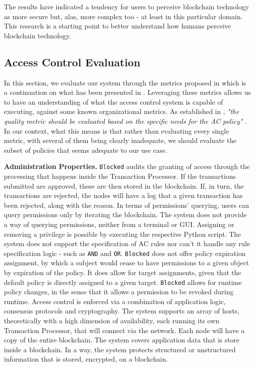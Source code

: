 The results have indicated a tendency for users to perceive blockchain technology as more secure but, alas, more complex too - at least in this particular domain. This research is a starting point to better understand how humans perceive blockchain technology.

\subsection{Access Control Evaluation}
\label{sec:eval-ac}

In this section, we evaluate our system through the metrics proposed in \cite{hu_guidelines_2012} which is a continuation on what has been presented in \cite{hu_assessment_2006}. Leveraging these metrics allows us to have an understanding of what the access control system is capable of executing, against some known organizational metrics. As established in \cite{hu_guidelines_2012}, \emph{"the quality metric should be evaluated based on the specific needs for the AC policy"} \cite[25]{hu_guidelines_2012}. In our context, what this means is that rather than evaluating every single metric, with several of them being clearly inadequate, we should evaluate the subset of policies that seems adequate to our use case.

\textbf{Administration Properties.} \texttt{Blocked} audits the granting of access through the processing that happens inside the Transaction Processor. If the transactions submitted are approved, these are then stored in the blockchain. If, in turn, the transactions are rejected, the nodes will have a log that a given transaction has been rejected, along with the reason. In terms of permissions' querying, users can query permissions only by iterating the blockchain. The system does not provide a way of querying permissions, neither from a terminal or GUI. Assigning or removing a privilege is possible by executing the respective Python script. The system does not support the specification of AC rules nor can't it handle any rule specification logic - such as \texttt{AND} and \texttt{OR}. \texttt{Blocked} does not offer policy expiration assignment, by which a subject would cease to have permissions to a given object by expiration of the policy. It does allow for target assignments, given that the default policy is directly assigned to a given target. \texttt{Blocked} allows for runtime policy changes, in the sense that it allows a permission to be revoked during runtime. Access control is enforced via a combination of application logic, consensus protocols and cryptography. The system supports an array of hosts, theoretically with a high dimension of availability, each running its own Transaction Processor, that will connect via the network. Each node will have a copy of the entire blockchain. The system covers application data that is store inside a blockchain. In a way, the system protects structured or unstructured information that is stored, encrypted, on a blockchain.

